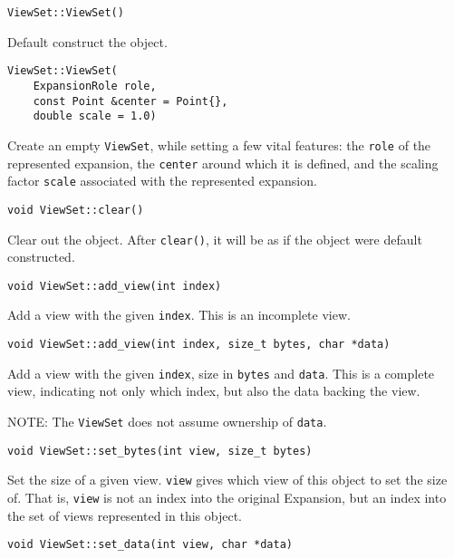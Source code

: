 \begin{lstlisting}
ViewSet::ViewSet()
\end{lstlisting}

\noindent Default construct the object.

\begin{lstlisting}
ViewSet::ViewSet(
    ExpansionRole role,
    const Point &center = Point{},
    double scale = 1.0)
\end{lstlisting}

\noindent Create an empty \texttt{ViewSet}, while setting a few vital features:
the \texttt{role} of the represented expansion, the \texttt{center} around
which it is defined, and the scaling factor \texttt{scale} associated with the
represented expansion.

\begin{lstlisting}
void ViewSet::clear()
\end{lstlisting}

\noindent Clear out the object. After \texttt{clear()}, it will be as if the
object were default constructed.

\begin{lstlisting}
void ViewSet::add_view(int index)
\end{lstlisting}

\noindent Add a view with the given \texttt{index}. This is an incomplete view.

\begin{lstlisting}
void ViewSet::add_view(int index, size_t bytes, char *data)
\end{lstlisting}

\noindent Add a view with the given \texttt{index}, size in \texttt{bytes} and
\texttt{data}. This is a complete view, indicating not only which index, but
also the data backing the view.

NOTE: The \texttt{ViewSet} does not assume ownership of \texttt{data}.

\begin{lstlisting}
void ViewSet::set_bytes(int view, size_t bytes)
\end{lstlisting}

\noindent Set the size of a given view. \texttt{view} gives which view of this
object to set the size of. That is, \texttt{view} is not an index into the
original Expansion, but an index into the set of views represented in this
object.

\begin{lstlisting}
void ViewSet::set_data(int view, char *data)
\end{lstlisting}

